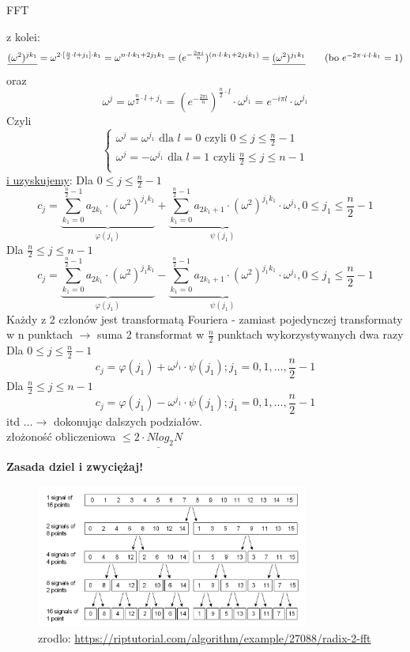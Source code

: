 \begin{frame}[allowframebreaks]{FFT}
\begin{block}{}
	\blockbreak
	z kolei:
	\[
		\underline{(\omega^2)^{jk_1}} = \omega^{2 \cdot [\frac{n}{2} \cdot l + j_1] \cdot k_1} = \omega^{n \cdot l \cdot k_1 + 2j_1k_1} = (e^{-\frac{2\pi i}{n}})^{(n \cdot l \cdot k_1 + 2j_1k_1)} = \underline{(\omega^2)^{j_1k_1}}
		\tag{bo $e^{-2\pi \cdot i  \cdot l  \cdot k_1}=1$}
	\]
	oraz
	\[
	\omega^{j} = \omega^{\frac{n}{2} \cdot l + j_1} = (e^{-\frac{2\pi i}{n}})^{\frac{n}{2}\cdot l} \cdot \omega^{j_1}=e^{-i \pi l} \cdot \omega^{j_1}
	\]
	Czyli
	\[
	\begin{cases}
		\omega^j=\omega^{j_{1}} \text{ dla } l=0 \text{ czyli }0 \leq j \leq \frac{n}{2} - 1\\
		\omega^j=-\omega^{j_{1}} \text{ dla } l=1 \text{ czyli } \frac{n}{2}  \leq j \leq n-1\\
	\end{cases}
	\]
 \blockbreak
	\underline{i uzyskujemy}:
	Dla $0 \leq j \leq \frac{n}{2} - 1$
	\[
		c_j = \underbrace{\sum\limits_{k_1 = 0}^{\frac{n}{2} - 1} a_{2 k_1} \cdot (\omega^2)^{j_1k_1}}_{\varphi(j_1)} + \underbrace{ \sum\limits_{k_1 = 0}^{\frac{n}{2}-1} a_{2 k_1+1} \cdot (\omega^2)^{j_1k_1}}_{\psi(j_1)} \cdot \omega^{j_1}, 0\leq j_1 \leq \frac{n}{2} - 1
	\]
	Dla $\frac{n}{2}  \leq j \leq n-1$
	\[
		c_j = \underbrace{\sum\limits_{k_1 = 0}^{\frac{n}{2} - 1} a_{2 k_1} \cdot (\omega^2)^{j_1k_1}}_{\varphi(j_1)} - \underbrace{ \sum\limits_{k_1 = 0}^{\frac{n}{2}-1} a_{2 k_1+1} \cdot (\omega^2)^{j_1k_1}}_{\psi(j_1)} \cdot \omega^{j_1}, 0\leq j_1 \leq \frac{n}{2} - 1
	\]
	\blockbreak
	Każdy z 2 członów jest transformatą Fouriera - zamiast pojedynczej transformaty w n punktach $\to$ suma 2 transformat w $\frac{n}{2}$ punktach wykorzystywanych dwa razy\\
Dla $0 \leq j \leq \frac{n}{2} - 1$
	\[
		c_j = \varphi(j_1) + \omega^{j_1} \cdot \psi(j_1) ; j_1 = 0, 1, \dots, \frac{n}{2} - 1
	\]
Dla $\frac{n}{2}  \leq j \leq n-1$	
	\[
		c_j = \varphi(j_1) - \omega^{j_1} \cdot \psi(j_1) ; j_1 = 0, 1, \dots, \frac{n}{2} - 1
	\]
	itd $\dots \to$ dokonując dalszych podziałów. \\
	złożoność obliczeniowa $\leq \underline{2 \cdot Nlog_2N}$ \\
	\end{block}
	\begin{center}
	\textbf{Zasada dziel i zwyciężaj!}
	\begin{figure}
	    \centering
	   \includegraphics[width=0.8\textwidth]{img/16/podzialyFFT.png}
	    \caption{zrodlo: \url{https://riptutorial.com/algorithm/example/27088/radix-2-fft}}
	    \label{fig:my_label}
	\end{figure}
	\end{center}
	

\end{frame}
